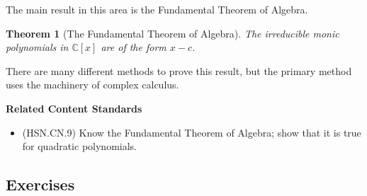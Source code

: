 \documentclass[
]{book}
\providecommand{\tightlist}{%
  \setlength{\itemsep}{0pt}\setlength{\parskip}{0pt}}
\newenvironment{standards}{}{}
\newtheorem{theorem}{Theorem}[chapter]
\theoremstyle{definition}
\theoremstyle{definition}
\theoremstyle{definition}
\theoremstyle{definition}
\theoremstyle{remark}
\begin{document}
The main result in this area is the Fundamental Theorem of Algebra.

\begin{theorem}[The Fundamental Theorem of Algebra]
The irreducible monic polynomials in \(\mathbb{C}[x]\) are of the form \(x-c\).
\end{theorem}

There are many different methods to prove this result, but the primary method uses the machinery of complex calculus.

\begin{standards}

\begin{center}
\textbf{Related Content Standards}

\end{center}

\begin{itemize}
\tightlist
\item
  (HSN.CN.9) Know the Fundamental Theorem of Algebra; show that it is true for quadratic polynomials.
\end{itemize}

\end{standards}

\hypertarget{exercises-25}{%
\subsection{Exercises}\label{exercises-25}}
\end{document}
